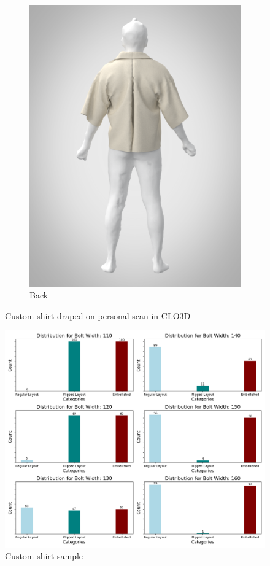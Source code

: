 \begin{figure}[H]
\begin{subfigure}[b]{0.3\textwidth}
        \includegraphics[width=\textwidth]{Images/render backpng.png}
        \caption{Back}
    \end{subfigure}
    \caption{Custom shirt draped on personal scan in CLO3D}
    \label{fig:renderedCLO}
\end{figure}

\begin{figure} [H]
    \centering
    \includegraphics[width = \textwidth]{Images/Mendeley_Bar.png}
    \caption{Custom shirt sample}
    \label{fig:personal_garment}
\end{figure}